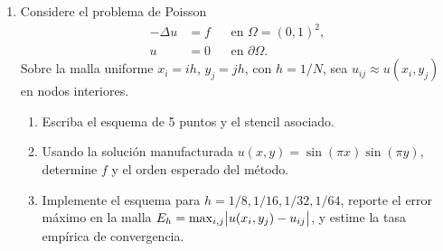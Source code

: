 \documentclass[11pt]{article}
\theoremstyle{thmstyle}
\renewcommand{\pd}[2]{\frac{\partial #1}{ \partial #2}}
\newcommand{\pdd}[2]{\frac{\partial^2 #1}{ \partial #2 ^2}}
\begin{document}
\begin{enumerate}[label=\textbf{\arabic*.}, leftmargin=*]

    \item Considere el problema de Poisson
    \[
    \begin{aligned}
        -\Delta u &= f && \text{en } \Omega=(0,1)^2, \\
        u &= 0 && \text{en } \partial\Omega.
    \end{aligned}
    \]
    Sobre la malla uniforme $x_i=ih$, $y_j=jh$, con $h=1/N$, sea $u_{ij}\approx u(x_i,y_j)$ en nodos interiores.
    \begin{enumerate}[label=(\alph*)]
        \item Escriba el esquema de 5 puntos y el stencil asociado.
        \item Usando la soluci\'on manufacturada $u(x,y)=\sin(\pi x)\sin(\pi y)$, determine $f$ y el orden esperado del m\'etodo.
        \item Implemente el esquema para $h=1/8,1/16,1/32,1/64$, reporte el error máximo en la malla $E_h=\max_{i,j}\abs{u(x_i,y_j)-u_{ij}}$, y estime la tasa emp\'irica de convergencia.
    \end{enumerate}



\end{enumerate}
\end{document}
